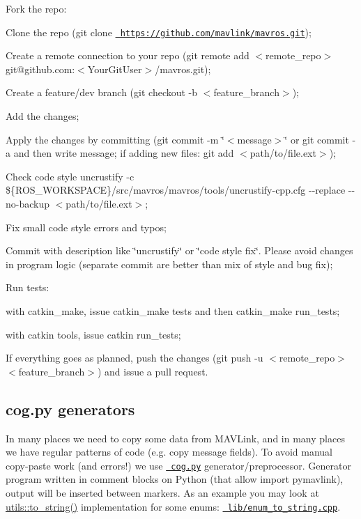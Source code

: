 
\begin{DoxyEnumerate}
\item Fork the repo\+: 
\item Clone the repo ({\ttfamily git clone \href{https://github.com/mavlink/mavros.git}{\texttt{ https\+://github.\+com/mavlink/mavros.\+git}}});
\item Create a remote connection to your repo ({\ttfamily git remote add $<$remote\+\_\+repo$>$ git@github.\+com\+:$<$Your\+Git\+User$>$/mavros.git});
\item Create a feature/dev branch ({\ttfamily git checkout -\/b $<$feature\+\_\+branch$>$});
\item Add the changes;
\item Apply the changes by committing ({\ttfamily git commit -\/m \char`\"{}$<$message$>$\char`\"{}} or {\ttfamily git commit -\/a} and then write message; if adding new files\+: {\ttfamily git add $<$path/to/file.\+ext$>$});
\item Check code style {\ttfamily uncrustify -\/c \$\{R\+O\+S\+\_\+\+W\+O\+R\+K\+S\+P\+A\+CE\}/src/mavros/mavros/tools/uncrustify-\/cpp.cfg -\/-\/replace -\/-\/no-\/backup $<$path/to/file.\+ext$>$};
\item Fix small code style errors and typos;
\item Commit with description like \char`\"{}uncrustify\char`\"{} or \char`\"{}code style fix\char`\"{}. Please avoid changes in program logic (separate commit are better than mix of style and bug fix);
\item Run tests\+:
\begin{DoxyItemize}
\item with {\ttfamily catkin\+\_\+make}, issue {\ttfamily catkin\+\_\+make tests} and then {\ttfamily catkin\+\_\+make run\+\_\+tests};
\item with {\ttfamily catkin tools}, issue {\ttfamily catkin run\+\_\+tests};
\end{DoxyItemize}
\item If everything goes as planned, push the changes ({\ttfamily git push -\/u $<$remote\+\_\+repo$>$ $<$feature\+\_\+branch$>$}) and issue a pull request.
\end{DoxyEnumerate}

\subsection*{cog.\+py generators }

In many places we need to copy some data from M\+A\+V\+Link, and in many places we have regular patterns of code (e.\+g. copy message fields). To avoid manual copy-\/paste work (and errors!) we use \href{https://nedbatchelder.com/code/cog/}{\texttt{ cog.\+py}} generator/preprocessor. Generator program written in comment blocks on Python (that allow import pymavlink), output will be inserted between markers. As an example you may look at {\ttfamily \mbox{\hyperlink{namespacemavlink_a3a4897758bbfeb0c28182fef6f3bc60f}{utils\+::to\+\_\+string()}}} implementation for some enums\+: \href{https://github.com/mavlink/mavros/blob/master/mavros/src/lib/enum_to_string.cpp}{\texttt{ lib/enum\+\_\+to\+\_\+string.\+cpp}}.

